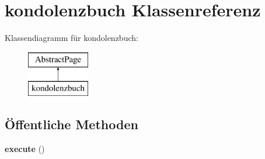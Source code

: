 \hypertarget{classkondolenzbuch}{}\section{kondolenzbuch Klassenreferenz}
\label{classkondolenzbuch}
Klassendiagramm für kondolenzbuch\+:\begin{figure}[H]
\begin{center}
\leavevmode
\includegraphics[height=2.000000cm]{classkondolenzbuch}
\end{center}
\end{figure}
\subsection*{Öffentliche Methoden}
\begin{DoxyCompactItemize}
\item 
\mbox{\label{classkondolenzbuch_af1a155df29e98cf63ada9dae828d1e45}} 
{\bfseries execute} ()
\end{DoxyCompactItemize}

